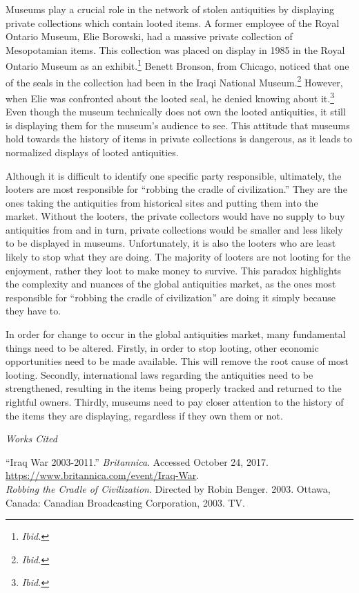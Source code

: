 \documentclass[11pt]{article}
\newenvironment{bib}[1]
  {\begin{list}
          {}
          {\setlength{\itemindent}{-#1}
           \setlength{\leftmargin}{#1}
           \setlength{\itemsep}{0pt}
           \setlength{\parsep}{\parskip}
           \setlength{\topsep}{\parskip}
           }
    \setlength{\parindent}{-#1}
    \item[]
  }
  {\end{list}}
\begin{document}
Museums play a crucial role in the network of stolen antiquities by displaying private collections which contain looted items. A former employee of the Royal Ontario Museum, Elie Borowski, had a massive private collection of Mesopotamian items. This collection was placed on display in 1985 in the Royal Ontario Museum as an exhibit.\footnote{\textit{Ibid.}} Benett Bronson, from Chicago, noticed that one of the seals in the collection had been in the Iraqi National Museum.\footnote{\textit{Ibid.}} However, when Elie was confronted about the looted seal, he denied knowing about it.\footnote{\textit{Ibid.}} Even though the museum technically does not own the looted antiquities, it still is displaying them for the museum's audience to see. This attitude that museums hold towards the history of items in private collections is dangerous, as it leads to normalized displays of looted antiquities.

Although it is difficult to identify one specific party responsible, ultimately, the looters are most responsible for ``robbing the cradle of civilization.'' They are the ones taking the antiquities from historical sites and putting them into the market. Without the looters, the private collectors would have no supply to buy antiquities from and in turn, private collections would be smaller and less likely to be displayed in museums. Unfortunately, it is also the looters who are least likely to stop what they are doing. The majority of looters are not looting for the enjoyment, rather they loot to make money to survive. This paradox highlights the complexity and nuances of the global antiquities market, as the ones most responsible for ``robbing the cradle of civilization'' are doing it simply because they have to.

In order for change to occur in the global antiquities market, many fundamental things need to be altered. Firstly, in order to stop looting, other economic opportunities need to be made available. This will remove the root cause of most looting. Secondly, international laws regarding the antiquities need to be strengthened, resulting in the items being properly tracked and returned to the rightful owners. Thirdly, museums need to pay closer attention to the history of the items they are displaying, regardless if they own them or not.

\newpage
\singlespacing
\begin{center}
{\large\textit{Works Cited}}
\end{center}

\begin{bib}{2em}
``Iraq War 2003-2011.'' \textit{Britannica}. Accessed October 24, 2017. \url{https://www.britannica.com/event/Iraq-War}. \\

\textit{Robbing the Cradle of Civilization}. Directed by Robin Benger. 2003. Ottawa, Canada: Canadian Broadcasting Corporation, 2003. TV.
\end{bib}
\end{document}
